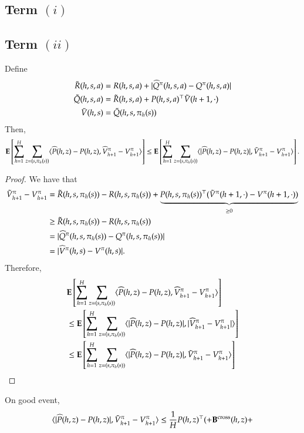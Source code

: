 \subsection{Term $(i)$}


\subsection{Term $(ii)$ }
\begin{lemma} Define 
\begin{align*}
\tilde{R}(h,s,a) &= R(h,s,a) + |\widehat{Q}^{\pi}(h,s,a) - Q^{\pi}(h,s,a)|\\
\tilde{Q}(h,s,a) &= \tilde{R}(h,s,a) + P(h,s,a)^\top \tilde{V}(h+1,\cdot)  \\
\tilde{V}(h,s) &= \tilde{Q}(h,s,\pi_h(s))
\end{align*}
Then, 
\begin{align*}
\mathbf{E}\left[\sum_{h=1}^H\sum_{z = (s,\pi_h(s))} \langle \widehat{P}(h,z) - P(h,z), \widehat{V}^{\pi}_{h+1} - V^{\pi}_{h+1}\rangle \right] \le \mathbf{E}\left[\sum_{h=1}^H\sum_{z = (s,\pi_h(s))} \langle |\widehat{P}(h,z) - P(h,z)|, \tilde{V}^{\pi}_{h+1} - V^{\pi}_{h+1}\rangle \right].
\end{align*}
\end{lemma}
\begin{proof}
We have that
\begin{align*}
\tilde{V}^{\pi}_{h+1} - V^{\pi}_{h+1}  &= \tilde{R}(h,s,\pi_h(s)) - R(h,s,\pi_h(s)) + \underbrace{P(h,s,\pi_h(s))^\top (\tilde{V}^{\pi}(h+1,\cdot) - V^{\pi}(h+1,\cdot))}_{\ge 0}\\
&\ge \tilde{R}(h,s,\pi_h(s)) - R(h,s,\pi_h(s))\\
&= |\widehat{Q}^{\pi}(h,s,\pi_h(s)) - Q^{\pi}(h,s,\pi_h(s))|\\
&= |\widehat{V}^{\pi}(h,s) - V^{\pi}(h,s)|.
\end{align*}
Therefore,
\begin{align*}
&\mathbf{E}\left[\sum_{h=1}^H\sum_{z = (s,\pi_h(s))} \langle \widehat{P}(h,z) - P(h,z), \widehat{V}^{\pi}_{h+1} - V^{\pi}_{h+1}\rangle \right] \\
&\le \mathbf{E}\left[\sum_{h=1}^H\sum_{z = (s,\pi_h(s))} \langle |\widehat{P}(h,z) - P(h,z)|, |\widehat{V}^{\pi}_{h+1} - V^{\pi}_{h+1}|\rangle \right]\\
&\le \mathbf{E}\left[\sum_{h=1}^H\sum_{z = (s,\pi_h(s))} \langle |\widehat{P}(h,z) - P(h,z)|, \tilde{V}^{\pi}_{h+1} - V^{\pi}_{h+1}\rangle \right]
\end{align*}
\end{proof}

\begin{lemma} On good event,
\begin{align*}
 \langle |\widehat{P}(h,z) - P(h,z)|, \tilde{V}^{\pi}_{h+1} - V^{\pi}_{h+1}\rangle \le \frac{1}{H} P(h,z)^\top (+ \mathbf{B}^{\mathrm{cross}}(h,z) + 
\end{align*}
\end{lemma}



